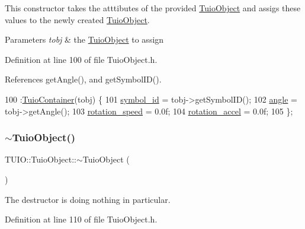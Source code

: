 This constructor takes the atttibutes of the provided \hyperlink{class_t_u_i_o_1_1_tuio_object}{Tuio\+Object} and assigs these values to the newly created \hyperlink{class_t_u_i_o_1_1_tuio_object}{Tuio\+Object}.


\begin{DoxyParams}{Parameters}
{\em tobj} & the \hyperlink{class_t_u_i_o_1_1_tuio_object}{Tuio\+Object} to assign \\
\hline
\end{DoxyParams}


Definition at line 100 of file Tuio\+Object.\+h.



References get\+Angle(), and get\+Symbol\+I\+D().


\begin{DoxyCode}
100                                      :\hyperlink{class_t_u_i_o_1_1_tuio_container_a970e6fa8eefc231dccf75d11b68c289d}{TuioContainer}(tobj) \{
101             \hyperlink{class_t_u_i_o_1_1_tuio_object_a05c245f10efaa7bf97b6c383004d6b7f}{symbol\_id} = tobj->getSymbolID();
102             \hyperlink{class_t_u_i_o_1_1_tuio_object_a1c5652a3ee1175156f13777f0d8068ee}{angle} = tobj->getAngle();
103             \hyperlink{class_t_u_i_o_1_1_tuio_object_aee8d80d314a66646b834b2d74e0073d1}{rotation\_speed} = 0.0f;
104             \hyperlink{class_t_u_i_o_1_1_tuio_object_a793a29a0bf9fd2f1becdb9d2d45fc463}{rotation\_accel} = 0.0f;
105         \};
\end{DoxyCode}
\mbox{\label{class_t_u_i_o_1_1_tuio_object_aa9cde21ddda361193c556dbeb8433de0}} 
\subsubsection{\texorpdfstring{$\sim$\+Tuio\+Object()}{~TuioObject()}}
{\footnotesize\ttfamily T\+U\+I\+O\+::\+Tuio\+Object\+::$\sim$\+Tuio\+Object (\begin{DoxyParamCaption}{ }\end{DoxyParamCaption})\hspace{0.3cm}{\ttfamily [inline]}}

The destructor is doing nothing in particular. 

Definition at line 110 of file Tuio\+Object.\+h.


